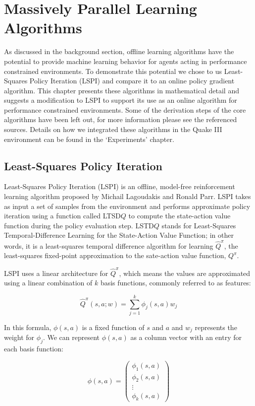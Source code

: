 \chapter{Massively Parallel Learning Algorithms}

As discussed in the background section, offline learning algorithms have the potential to provide machine learning behavior for agents acting in performance constrained environments. To demonstrate this potential we chose to us Least-Squares Policy Iteration (LSPI) and compare it to an online policy gradient algorithm. This chapter presents these algorithms in mathematical detail and suggests a modification to LSPI to support its use as an online algorithm for performance constrained environments. Some of the derivation steps of the core algorithms have been left out, for more information please see the referenced sources. Details on how we integrated these algorithms in the Quake III environment can be found in the `Experiments' chapter.

\section{Least-Squares Policy Iteration}

Least-Squares Policy Iteration (LSPI) is an offline, model-free reinforcement learning algorithm proposed by Michail Lagoudakis and Ronald Parr. \cite{lspi} LSPI takes as input a set of samples from the environment and performs approximate policy iteration using a function called LTSD$Q$ to compute the state-action value function during the policy evaluation step. LSTD$Q$ stands for Least-Squares Temporal-Difference Learning for the State-Action Value Function; in other words, it is a least-squares temporal difference algorithm for learning $\hat{Q}^\pi$, the least-squares fixed-point approximation to the sate-action value function, $Q^\pi$.

LSPI uses a linear architecture for $\hat{Q}^\pi$, which means the values are approximated using a linear combination of $k$ basis functions, commonly referred to as features:

\[
    \hat{Q}^\pi(s,a;w) = \sum_{j=1}^k \phi_j(s,a)w_j
\]

In this formula, $\phi(s,a)$ is a fixed function of $s$ and $a$ and $w_j$ represents the weight for $\phi_j$. We can represent $\phi(s,a)$ as a column vector with an entry for each basis function:


\[
    \phi(s,a) = \begin{pmatrix}
       \phi_1(s,a) \\ \phi_2(s,a) \\ \vdots \\ \phi_k(s,a)
    \end{pmatrix}
\]

